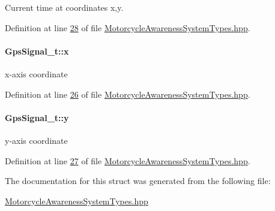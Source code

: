 Current time at coordinates x,y. 



Definition at line \hyperlink{MotorcycleAwarenessSystemTypes_8hpp_source_l00028}{28} of file \hyperlink{MotorcycleAwarenessSystemTypes_8hpp_source}{Motorcycle\-Awareness\-System\-Types.\-hpp}.

\hypertarget{structGpsSignal__t_a6f7bd3c500b55923ab335ada4b6b26eb}{
\paragraph[{x}]{ Gps\-Signal\-\_\-t\-::x}}\label{structGpsSignal__t_a6f7bd3c500b55923ab335ada4b6b26eb}


x-\/axis coordinate 



Definition at line \hyperlink{MotorcycleAwarenessSystemTypes_8hpp_source_l00026}{26} of file \hyperlink{MotorcycleAwarenessSystemTypes_8hpp_source}{Motorcycle\-Awareness\-System\-Types.\-hpp}.

\hypertarget{structGpsSignal__t_ab9e083be189fc842ed7aa4fdc978e94e}{
\paragraph[{y}]{ Gps\-Signal\-\_\-t\-::y}}\label{structGpsSignal__t_ab9e083be189fc842ed7aa4fdc978e94e}


y-\/axis coordinate 



Definition at line \hyperlink{MotorcycleAwarenessSystemTypes_8hpp_source_l00027}{27} of file \hyperlink{MotorcycleAwarenessSystemTypes_8hpp_source}{Motorcycle\-Awareness\-System\-Types.\-hpp}.



The documentation for this struct was generated from the following file\-:\begin{DoxyCompactItemize}
\item 
\hyperlink{MotorcycleAwarenessSystemTypes_8hpp}{Motorcycle\-Awareness\-System\-Types.\-hpp}\end{DoxyCompactItemize}
